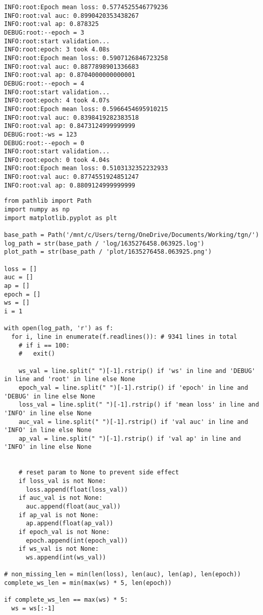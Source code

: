 \documentclass[11pt]{article}
\begin{document}
\begin{verbatim}
INFO:root:Epoch mean loss: 0.5774525546779236
INFO:root:val auc: 0.8990420353438267
INFO:root:val ap: 0.878325
DEBUG:root:--epoch = 3
INFO:root:start validation...
INFO:root:epoch: 3 took 4.08s
INFO:root:Epoch mean loss: 0.5907126846723258
INFO:root:val auc: 0.8877898901336683
INFO:root:val ap: 0.8704000000000001
DEBUG:root:--epoch = 4
INFO:root:start validation...
INFO:root:epoch: 4 took 4.07s
INFO:root:Epoch mean loss: 0.5966454695910215
INFO:root:val auc: 0.8398419282383518
INFO:root:val ap: 0.8473124999999999
DEBUG:root:-ws = 123
DEBUG:root:--epoch = 0
INFO:root:start validation...
INFO:root:epoch: 0 took 4.04s
INFO:root:Epoch mean loss: 0.5103132352232933
INFO:root:val auc: 0.8774551924851247
INFO:root:val ap: 0.8809124999999999
\end{verbatim}

\begin{verbatim}
from pathlib import Path
import numpy as np
import matplotlib.pyplot as plt

base_path = Path('/mnt/c/Users/terng/OneDrive/Documents/Working/tgn/')
log_path = str(base_path / 'log/1635276458.063925.log')
plot_path = str(base_path / 'plot/1635276458.063925.png')

loss = []
auc = []
ap = []
epoch = []
ws = []
i = 1

with open(log_path, 'r') as f:
  for i, line in enumerate(f.readlines()): # 9341 lines in total
    # if i == 100:
    #   exit()

    ws_val = line.split(" ")[-1].rstrip() if 'ws' in line and 'DEBUG' in line and 'root' in line else None
    epoch_val = line.split(" ")[-1].rstrip() if 'epoch' in line and 'DEBUG' in line else None
    loss_val = line.split(" ")[-1].rstrip() if 'mean loss' in line and 'INFO' in line else None
    auc_val = line.split(" ")[-1].rstrip() if 'val auc' in line and 'INFO' in line else None
    ap_val = line.split(" ")[-1].rstrip() if 'val ap' in line and 'INFO' in line else None


    # reset param to None to prevent side effect
    if loss_val is not None:
      loss.append(float(loss_val))
    if auc_val is not None:
      auc.append(float(auc_val))
    if ap_val is not None:
      ap.append(float(ap_val))
    if epoch_val is not None:
      epoch.append(int(epoch_val))
    if ws_val is not None:
      ws.append(int(ws_val))

# non_missing_len = min(len(loss), len(auc), len(ap), len(epoch))
complete_ws_len = min(max(ws) * 5, len(epoch))

if complete_ws_len == max(ws) * 5:
  ws = ws[:-1]


\end{verbatim}
\end{document}
